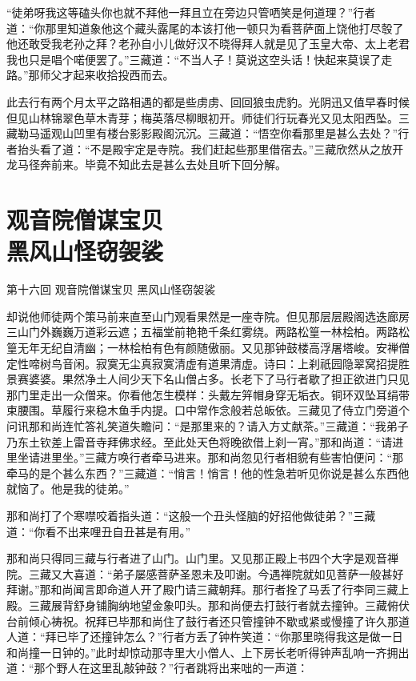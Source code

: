 \documentclass[12pt,UTF8]{ctexbook}
\begin{document}
{“徒弟呀我这等磕头你也就不拜他一拜且立在旁边只管哂笑是何道理？”行者道：“你那里知道象他这个藏头露尾的本该打他一顿只为看菩萨面上饶他打尽彀了他还敢受我老孙之拜？老孙自小儿做好汉不晓得拜人就是见了玉皇大帝、太上老君我也只是唱个喏便罢了。”三藏道：“不当人子！莫说这空头话！快起来莫误了走路。”那师父才起来收拾投西而去。

此去行有两个月太平之路相遇的都是些虏虏、回回狼虫虎豹。光阴迅又值早春时候但见山林锦翠色草木青芽；梅英落尽柳眼初开。师徒们行玩春光又见太阳西坠。三藏勒马遥观山凹里有楼台影影殿阁沉沉。三藏道：“悟空你看那里是甚么去处？”行者抬头看了道：“不是殿宇定是寺院。我们赶起些那里借宿去。”三藏欣然从之放开龙马径奔前来。毕竟不知此去是甚么去处且听下回分解。

\chapter[观音院僧谋宝贝\ 黑风山怪窃袈裟]{观音院僧谋宝贝\\黑风山怪窃袈裟}

第十六回 观音院僧谋宝贝 黑风山怪窃袈裟

却说他师徒两个策马前来直至山门观看果然是一座寺院。但见那层层殿阁选迭廊房三山门外巍巍万道彩云遮；五福堂前艳艳千条红雾绕。两路松篁一林桧柏。两路松篁无年无纪自清幽；一林桧柏有色有颜随傲丽。又见那钟鼓楼高浮屠塔峻。安禅僧定性啼树鸟音闲。寂寞无尘真寂寞清虚有道果清虚。诗曰：上刹祇园隐翠窝招提胜景赛婆婆。果然净土人间少天下名山僧占多。长老下了马行者歇了担正欲进门只见那门里走出一众僧来。你看他怎生模样：头戴左笄帽身穿无垢衣。铜环双坠耳绢带束腰围。草履行来稳木鱼手内提。口中常作念般若总皈依。三藏见了侍立门旁道个问讯那和尚连忙答礼笑道失瞻问：“是那里来的？请入方丈献茶。”三藏道：“我弟子乃东土钦差上雷音寺拜佛求经。至此处天色将晚欲借上刹一宵。”那和尚道：“请进里坐请进里坐。”三藏方唤行者牵马进来。那和尚忽见行者相貌有些害怕便问：“那牵马的是个甚么东西？”三藏道：“悄言！悄言！他的性急若听见你说是甚么东西他就恼了。他是我的徒弟。”

那和尚打了个寒噤咬着指头道：“这般一个丑头怪脑的好招他做徒弟？”三藏道：“你看不出来哩丑自丑甚是有用。”

那和尚只得同三藏与行者进了山门。山门里。又见那正殿上书四个大字是观音禅院。三藏又大喜道：“弟子屡感菩萨圣恩未及叩谢。今遇禅院就如见菩萨一般甚好拜谢。”那和尚闻言即命道人开了殿门请三藏朝拜。那行者拴了马丢了行李同三藏上殿。三藏展背舒身铺胸纳地望金象叩头。那和尚便去打鼓行者就去撞钟。三藏俯伏台前倾心祷祝。祝拜已毕那和尚住了鼓行者还只管撞钟不歇或紧或慢撞了许久那道人道：“拜已毕了还撞钟怎么？”行者方丢了钟杵笑道：“你那里晓得我这是做一日和尚撞一日钟的。”此时却惊动那寺里大小僧人、上下房长老听得钟声乱响一齐拥出道：“那个野人在这里乱敲钟鼓？”行者跳将出来咄的一声道：

}
\end{document}
